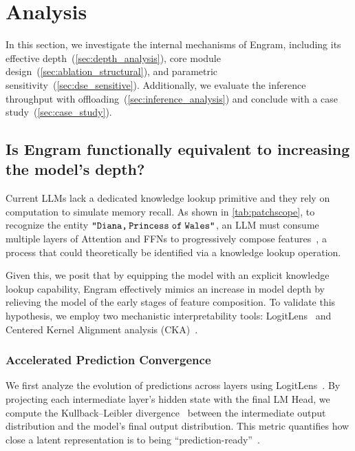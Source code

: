 \section{Analysis}
In this section, we investigate the internal mechanisms of Engram, including its effective depth~(\autoref{sec:depth_analysis}), core module design~(\autoref{sec:ablation_structural}), and parametric sensitivity~(\autoref{sec:dse_sensitive}). Additionally, we evaluate the inference throughput with offloading~(\autoref{sec:inference_analysis}) and conclude with a case study~(\autoref{sec:case_study}).

\subsection{Is Engram functionally equivalent to increasing the model’s depth?}
\label{sec:depth_analysis}

Current LLMs lack a dedicated knowledge lookup primitive and they rely on computation to simulate memory recall. As shown in \autoref{tab:patchscope}, to recognize the entity $\texttt{"Diana,\,Princess\;of\;Wales"}$, an LLM must consume multiple layers of Attention and FFNs to progressively compose features~\citep{li2025echoesbertmodernlanguage,ghandeharioun2024patchscopes,DBLP:conf/coling/JinYHZWH0MMDYDZ25}, a process that could theoretically be identified via a knowledge lookup operation.

Given this, we posit that by equipping the model with an explicit knowledge lookup capability, Engram effectively mimics an increase in model depth by relieving the model of the early stages of feature composition. To validate this hypothesis, we employ two mechanistic interpretability tools: LogitLens~\citep{nostalgebraist2020logitlens,belrose2023eliciting} and Centered Kernel Alignment analysis (CKA)~\citep{kornblith2019similarity,davari2022reliability}.

\subsubsection{Accelerated Prediction Convergence}
\label{sec:logitlens}

We first analyze the evolution of predictions across layers using LogitLens~\citep{nostalgebraist2020logitlens}. By projecting each intermediate layer's hidden state with the final LM Head, we compute the Kullback–Leibler divergence~\citep{kullback1951information} between the intermediate output distribution and the model's final output distribution. This metric quantifies how close a latent representation is to being ``prediction-ready''~\citep{csordas2025language,belrose2023eliciting}.

